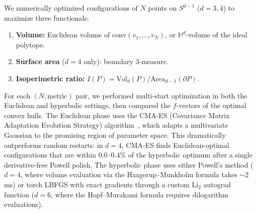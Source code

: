 \documentclass[11pt]{article}
\begin{document}
We numerically optimized configurations of $N$ points on $S^{d-1}$
($d = 3, 4$) to maximize three functionals:
\begin{enumerate}[label=(\alph*)]
\item \textbf{Volume:} Euclidean volume of $\mathrm{conv}(v_1,\ldots,v_N)$,
      or $\mathbb{H}^d$-volume of the ideal polytope.
\item \textbf{Surface area} ($d=4$ only): boundary $3$-measure.
\item \textbf{Isoperimetric ratio:} $I(P) = \mathrm{Vol}_d(P) / \mathrm{Area}_{d-1}(\partial P)$.
\end{enumerate}
For each $(N, \text{metric})$ pair, we performed multi-start optimization
in both the Euclidean and hyperbolic settings,
then compared the $f$-vectors of the optimal convex hulls.
The Euclidean phase uses the CMA-ES (Covariance Matrix Adaptation
Evolution Strategy) algorithm~\cite{HansenOstermeier2001},
which adapts a multivariate Gaussian to the promising region of
parameter space.  This dramatically outperforms random restarts:
in $d = 4$, CMA-ES finds Euclidean-optimal configurations that
are within $0.0$--$0.4\%$ of the hyperbolic optimum after a single
derivative-free Powell polish.  The hyperbolic phase uses either
Powell's method ($d = 4$, where volume evaluation via the
Haagerup--Munkholm formula takes $\sim$2\,ms) or torch LBFGS
with exact gradients through a custom $\mathrm{Li}_2$
autograd function ($d = 6$, where the Hopf--Murakami formula
requires dilogarithm evaluations).
\end{document}
